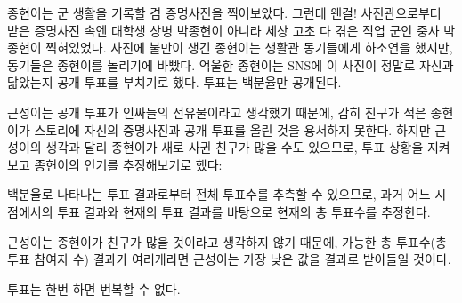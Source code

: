 종현이는 군 생활을 기록할 겸 증명사진을 찍어보았다. 그런데 왠걸! 사진관으로부터 받은 증명사진 속엔 대학생 상병 박종현이 아니라 세상 고초 다 겪은 직업 군인 중사 박종현이 찍혀있었다. 사진에 불만이 생긴 종현이는 생활관 동기들에게 하소연을 했지만, 동기들은 종현이를 놀리기에 바빴다. 억울한 종현이는 SNS에 이 사진이 정말로 자신과 닮았는지 공개 투표를 부치기로 했다. 투표는 백분율만 공개된다.

근성이는 공개 투표가 인싸들의 전유물이라고 생각했기 때문에, 감히 친구가 적은 종현이가 스토리에 자신의 증명사진과 공개 투표를 올린 것을 용서하지 못한다. 하지만 근성이의 생각과 달리 종현이가 새로 사귄 친구가 많을 수도 있으므로, 투표 상황을 지켜보고 종현이의 인기를 추정해보기로 했다:

백분율로 나타나는 투표 결과로부터 전체 투표수를 추측할 수 있으므로, 과거 어느 시점에서의 투표 결과와 현재의 투표 결과를 바탕으로 현재의 총 투표수를 추정한다.

근성이는 종현이가 친구가 많을 것이라고 생각하지 않기 때문에, 가능한 총 투표수(총 투표 참여자 수) 결과가 여러개라면 근성이는 가장 낮은 값을 결과로 받아들일 것이다.

투표는 한번 하면 번복할 수 없다.
